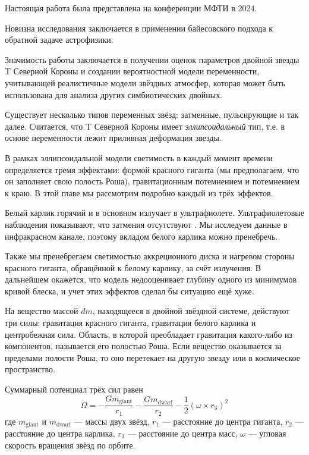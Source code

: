 Настоящая работа была представлена на конференции МФТИ в 2024.

Новизна исследования заключается в применении байесовского подхода к обратной задаче астрофизики.

Значимость работы заключается в получении оценок параметров двойной звезды T Северной Короны и создании вероятностной модели переменности, учитывающей реалистичные модели звёздных атмосфер, которая может быть использована для анализа других симбиотических двойных.



Существует несколько типов переменных звёзд: затменные, пульсирующие и так далее. Считается, что T Северной Короны имеет \emph{эллипсоидальный} тип, т.е. в основе переменности лежит приливная деформация звезды.

В рамках эллипсоидальной модели \cite{Cherepashchuk} светимость в каждый момент времени определяется тремя эффектами: формой красного гиганта (мы предполагаем, что он заполняет свою полость Роша), гравитационным потемнением и потемнением к краю. В этой главе мы рассмотрим подробно каждый из трёх эффектов.

Белый карлик горячий и в основном излучает в ультрафиолете. Ультрафиолетовые наблюдения показывают, что затмения отсутствуют \cite{UV}. Мы исследуем данные в инфракрасном канале, поэтому вкладом белого карлика можно пренебречь.

Также мы пренебрегаем светимостью аккреционного диска и нагревом стороны красного гиганта, обращённой к белому карлику, за счёт излучения. В дальнейшем окажется, что модель недооценивает глубину одного из минимумов кривой блеска, и учет этих эффектов сделал бы ситуацию ещё хуже.


На вещество массой $dm$, находящееся в двойной звёздной системе, действуют три силы: гравитация красного гиганта, гравитация белого карлика и центробежная сила. Область, в которой преобладает гравитация какого-либо из компонентов, называется его полостью Роша. Если вещество оказывается за пределами полости Роша, то оно перетекает на другую звезду или в космическое пространство.

Суммарный потенциал трёх сил равен
\begin{equation}
\Omega = 
-\frac{G m_\text{giant}}{r_1}
-\frac{G m_\text{dwarf}}{r_2}
-\frac{1}{2} (\omega \times r_3)^2
\label{eq:roche_generic}
\end{equation}
где $m_\text{giant}$ и $m_\text{dwarf}$ --- массы двух звёзд, $r_1$ --- расстояние до центра гиганта, $r_2$ --- расстояние до центра карлика, $r_3$ --- расстояние до центра масс, $\omega$ --- угловая скорость вращения звёзд по орбите.

